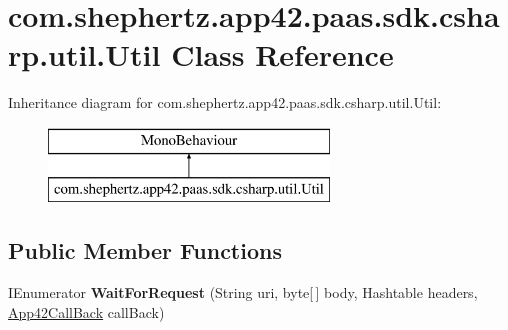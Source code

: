 \hypertarget{classcom_1_1shephertz_1_1app42_1_1paas_1_1sdk_1_1csharp_1_1util_1_1_util}{\section{com.\+shephertz.\+app42.\+paas.\+sdk.\+csharp.\+util.\+Util Class Reference}
\label{classcom_1_1shephertz_1_1app42_1_1paas_1_1sdk_1_1csharp_1_1util_1_1_util}
}
Inheritance diagram for com.\+shephertz.\+app42.\+paas.\+sdk.\+csharp.\+util.\+Util\+:\begin{figure}[H]
\begin{center}
\leavevmode
\includegraphics[height=2.000000cm]{classcom_1_1shephertz_1_1app42_1_1paas_1_1sdk_1_1csharp_1_1util_1_1_util}
\end{center}
\end{figure}
\subsection*{Public Member Functions}
\begin{DoxyCompactItemize}
\item 
\hypertarget{classcom_1_1shephertz_1_1app42_1_1paas_1_1sdk_1_1csharp_1_1util_1_1_util_ac87c59bf72f72e1a79112a2a224197af}{I\+Enumerator {\bfseries Wait\+For\+Request} (String uri, byte\mbox{[}$\,$\mbox{]} body, Hashtable headers, \hyperlink{interfacecom_1_1shephertz_1_1app42_1_1paas_1_1sdk_1_1csharp_1_1_app42_call_back}{App42\+Call\+Back} call\+Back)}\label{classcom_1_1shephertz_1_1app42_1_1paas_1_1sdk_1_1csharp_1_1util_1_1_util_ac87c59bf72f72e1a79112a2a224197af}

\end{DoxyCompactItemize}
